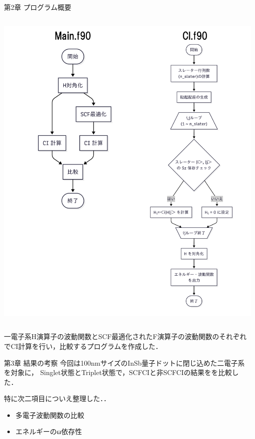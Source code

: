 \documentclass{beamer}
\begin{document}
\begin{frame}{第2章 プログラム概要}

  \begin{columns}
    \begin{center}
      \includegraphics[width=0.8\linewidth]{imeges/フローチャート.png}
    \end{center}  
  \end{columns}
一電子系H演算子の波動関数とSCF最適化されたF演算子の波動関数のそれぞれでCI計算を行い，比較するプログラムを作成した．
  \end{frame}  

 

\begin{frame}{第3章 結果の考察}
  今回は100nmサイズのInSb量子ドットに閉じ込めた二電子系を対象に，
  Singlet状態とTriplet状態で，SCFCIと非SCFCIの結果をを比較した．

  特に次二項目についえ整理した．．
  \begin{itemize}
    \item 多電子波動関数の比較
    \item エネルギーのω依存性
  \end{itemize}
\end{frame}  
\end{document}
